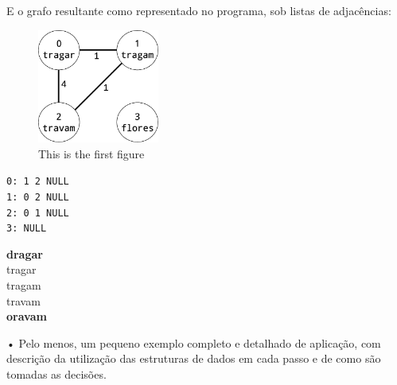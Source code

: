\documentclass[a4paper, 18pt]{article}
\begin{document}
  E o grafo resultante como representado no programa, sob listas de adjacências: \\
	\begin{minipage}{\linewidth}
		  \centering
		  \begin{minipage}{0.45\linewidth}
			  \begin{figure}[H]
				  \centering
				  \includegraphics[width=4cm]{graph}
				  \caption{This is the first figure}
			  \end{figure}
		  \end{minipage}
		  \hspace{0.05\linewidth}
		  \begin{minipage}{0.45\linewidth}
			\begin{center}
				\texttt{0: 1 \textrightarrow{} 2 \textrightarrow{} NULL \\
						1: 0 \textrightarrow{} 2 \textrightarrow{} NULL \\
						2: 0 \textrightarrow{} 1 \textrightarrow{} NULL \\
						3: \textrightarrow{} NULL}
			\end{center}
		  \end{minipage}
	  \end{minipage}

	\textbf{dragar} \\
	tragar \\
	tragam \\
	travam \\
	\textbf{oravam}
	\par
• Pelo menos, um pequeno exemplo completo e detalhado de aplicação, com descrição
da utilização das estruturas de dados em cada passo e de como são tomadas as
decisões.
\end{document}

